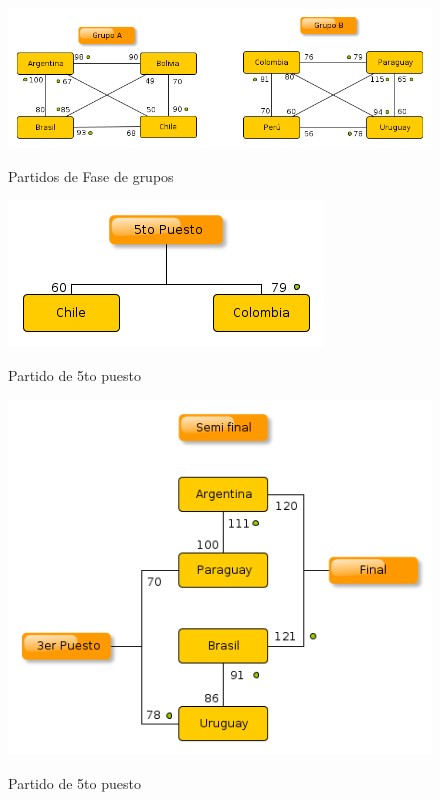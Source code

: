 \documentclass[11pt, a4paper, spanish]{article}
\begin{document}
{{{\begin{figure}
	\centering
	\includegraphics[scale=0.6]{diagramas/partidoDeFase.png}\\
	\caption{Partidos de Fase de grupos}
\end{figure}

\begin{figure}
	\centering
	\includegraphics[scale=0.6]{diagramas/partido5toPuesto.png}\\
	\caption{Partido de 5to puesto}
\end{figure}

\begin{figure}
	\centering
	\includegraphics[scale=0.6]{diagramas/partidoSemi3erYFinal.png}\\
	\caption{Partido de 5to puesto}
\end{figure}

}}}
\end{document}
